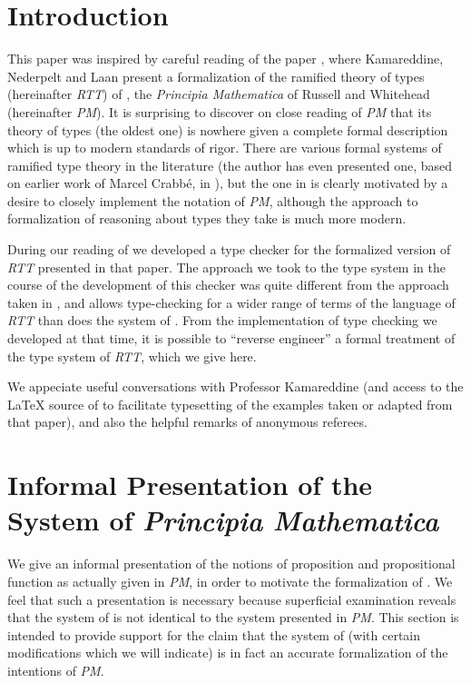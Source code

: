 \documentclass{article}
\begin{document}
\section{Introduction}

This paper was inspired by careful reading of the paper
\cite{types40}, where Kamareddine, Nederpelt and Laan present a
formalization of the ramified theory of types (hereinafter {\em
RTT\/}) of \cite{principia}, the {\em Principia Mathematica\/} of
Russell and Whitehead (hereinafter {\em PM\/}).  It is surprising to
discover on close reading of {\em PM\/} that its theory of types (the
oldest one) is nowhere given a complete formal description which is up
to modern standards of rigor.  There are various formal systems of
ramified type theory in the literature (the author has even presented
one, based on earlier work of Marcel Crabb\'e, in \cite{ndjfl}), but
the one in \cite{types40} is clearly motivated by a desire to closely
implement the notation of {\em PM\/}, although the approach to
formalization of reasoning about types they take is much more modern.

During our reading of \cite{types40} we developed a type checker
\cite{software} for the formalized version of {\em RTT\/} presented
in that paper.  The approach we took to the type system in the course
of the development of this checker was quite different from the
approach taken in \cite{types40}, and allows type-checking for a wider
range of terms of the language of {\em RTT\/} than does the system of
\cite{types40}.  From the implementation of type checking we developed
at that time, it is possible to ``reverse engineer'' a formal
treatment of the type system of {\em RTT\/}, which we give here.

We appeciate useful conversations with Professor Kamareddine (and
access to the LaTeX source of \cite{types40} to facilitate typesetting
of the examples taken or adapted from that paper), and also the
helpful remarks of anonymous referees.

\section{Informal Presentation of the System of {\em Principia Mathematica\/}}

We give an informal presentation of the notions of proposition and
propositional function as actually given in {\em PM\/}, in order to
motivate the formalization of \cite{types40}.  We feel that such a
presentation is necessary because superficial examination reveals that
the system of \cite{types40} is not identical to the system presented
in {\em PM\/}.  This section is intended to provide support for the
claim that the system of \cite{types40} (with certain modifications
which we will indicate) is in fact an accurate formalization of the
intentions of {\em PM\/}.
\end{document}
